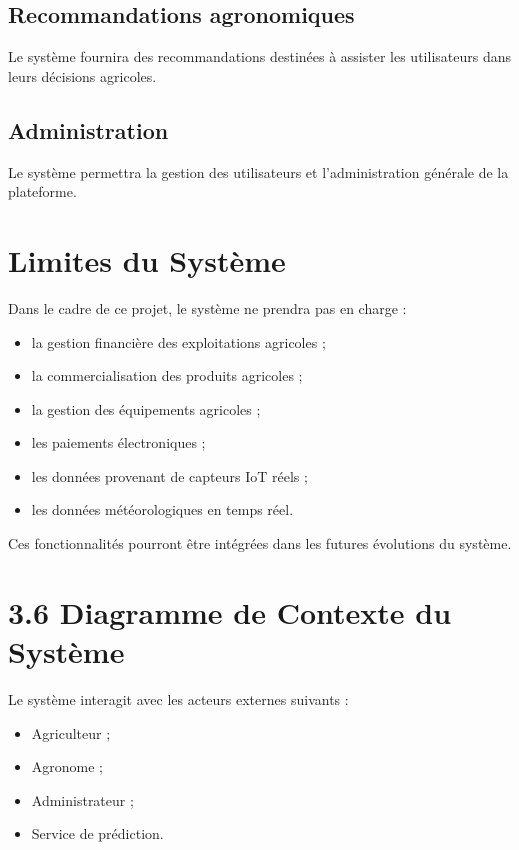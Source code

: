 \documentclass[12pt,a4paper]{report}
\begin{document}
\subsection{Recommandations
agronomiques}\label{recommandations-agronomiques-1}

Le système fournira des recommandations destinées à assister les
utilisateurs dans leurs décisions agricoles.

\subsection{Administration}\label{administration}

Le système permettra la gestion des utilisateurs et l'administration
générale de la plateforme.

\section{Limites du Système}\label{limites-du-systuxe8me}

Dans le cadre de ce projet, le système ne prendra pas en charge :

\begin{itemize}
\item
  la gestion financière des exploitations agricoles ;
\item
  la commercialisation des produits agricoles ;
\item
  la gestion des équipements agricoles ;
\item
  les paiements électroniques ;
\item
  les données provenant de capteurs IoT réels ;
\item
  les données météorologiques en temps réel.
\end{itemize}

Ces fonctionnalités pourront être intégrées dans les futures évolutions
du système.

\section{3.6 Diagramme de Contexte du
Système}\label{diagramme-de-contexte-du-systuxe8me}

Le système interagit avec les acteurs externes suivants :

\begin{itemize}
\item
  Agriculteur ;
\item
  Agronome ;
\item
  Administrateur ;
\item
  Service de prédiction.
\end{itemize}
\end{document}
